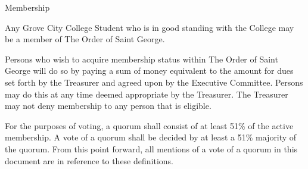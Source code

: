 {
\begin{article}{Membership}
	\item Any Grove City College Student who is in good standing with the College may be a member of The Order of Saint George.
	\item Persons who wish to acquire membership status within The Order of Saint George will do so by paying a sum of money equivalent to the amount for dues set forth by the Treasurer and agreed upon by the Executive Committee.  Persons may do this at any time deemed appropriate by the Treasurer.  The Treasurer may not deny membership to any person that is eligible.
	\item For the purposes of voting, a quorum shall consist of at least 51\% of the active membership.  A vote of a quorum shall be decided by at least a 51\% majority of the quorum.  From this point forward, all mentions of a vote of a quorum in this document are in reference to these definitions.
\end{article}
}